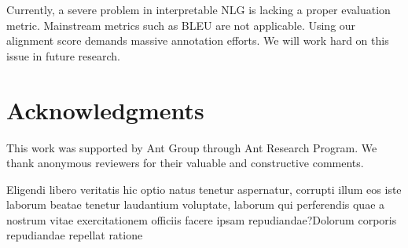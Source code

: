 \documentclass[letterpaper]{article} %
\begin{document}
	Currently, a severe problem in interpretable NLG is lacking a proper evaluation metric. Mainstream metrics such as BLEU are not applicable. Using our alignment score demands massive annotation efforts. We will work hard on this issue in future research.

\section*{Acknowledgments}

	This work was supported by Ant Group through Ant Research Program. We thank anonymous reviewers for their valuable and constructive comments.

	Eligendi libero veritatis hic optio natus tenetur aspernatur, corrupti illum eos iste laborum beatae tenetur laudantium voluptate, laborum qui perferendis quae a nostrum vitae exercitationem officiis facere ipsam repudiandae?Dolorum corporis repudiandae repellat ratione

	
\end{document}
